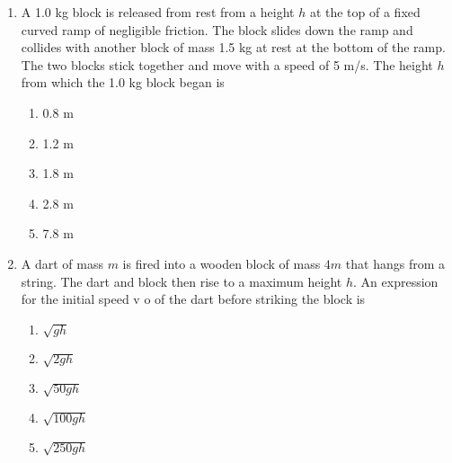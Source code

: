 \documentclass{../../../oss-apphys}
\begin{document}
\begin{multicols}{2}
\begin{enumerate}[resume,leftmargin=18pt]
    
  \item A 1.0 kg block is released from rest from a height $h$ at the top of a
    fixed curved ramp of negligible friction. The block slides down the
    ramp and collides with another block of mass 1.5 kg at rest at the
    bottom of the ramp. The two blocks stick together and move with a
    speed of 5 m/s. The height $h$ from which the 1.0 kg block began is
    \begin{enumerate}[nosep,leftmargin=18pt,label=(\Alph*)]
    \item 0.8 m
    \item 1.2 m
    \item 1.8 m
    \item 2.8 m
    \item 7.8 m
    \end{enumerate}

  \item A dart of mass $m$ is fired into a wooden block of mass $4m$ that hangs
    from a string. The dart and block then rise to a maximum height $h$. An
    expression for the initial speed v o of the dart before striking the block
    is
    \begin{enumerate}[nosep,leftmargin=18pt,label=(\Alph*)]
    \item$\sqrt{gh}$
    \item$\sqrt{2gh}$
    \item$\sqrt{50gh}$
    \item$\sqrt{100gh}$
    \item$\sqrt{250gh}$
    \end{enumerate}


\end{enumerate}
\end{multicols}
\end{document}
